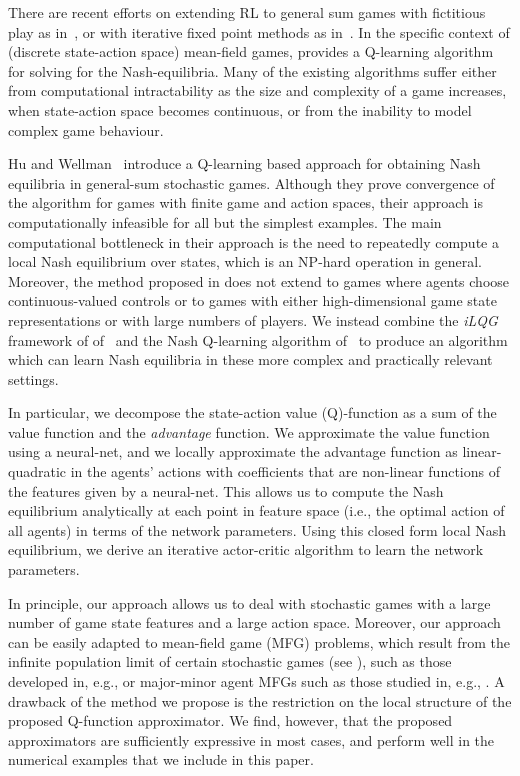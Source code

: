 \documentclass[onefignum,onetabnum]{siamonline171218}
\begin{document}
There are recent efforts on extending RL to general sum games with fictitious play as in~\cite{hu2019deep}, or with iterative fixed point methods as in~\cite{lanctot2017unified}. In the specific context of (discrete state-action space) mean-field games, \cite{guo2019learning} provides a Q-learning algorithm for solving for the Nash-equilibria. Many of the existing algorithms suffer either from computational intractability as the size and complexity of a game increases, when state-action space becomes continuous, or from the inability to model complex game behaviour.

Hu and Wellman~\cite{hu2003nash} introduce a Q-learning based approach for obtaining Nash equilibria in general-sum stochastic games. Although they prove convergence of the algorithm for games with finite game and action spaces,  their approach is computationally infeasible for all but the simplest examples. The main computational bottleneck in their approach is the need to repeatedly compute a local Nash equilibrium over states, which is an NP-hard operation in general. Moreover, the method proposed in \cite{hu2003nash} does not extend to games where agents choose continuous-valued controls or to games with either high-dimensional game state representations or with large numbers of players. We instead combine the \textit{iLQG} framework of of~\cite{todorov2005generalized,gu2016continuous} and the Nash Q-learning algorithm of~\cite{hu2003nash} to produce an algorithm which can learn Nash equilibria in these more complex and practically relevant settings. 

In particular, we decompose the state-action value (Q)-function as a sum of the value function and the \textit{advantage} function. We approximate the value function using a neural-net, and we locally approximate the advantage function as linear-quadratic in the agents' actions with coefficients that are non-linear functions of the features given by a neural-net. This allows us to compute the Nash equilibrium analytically at each point in feature space (i.e., the optimal action of all agents) in terms of the network parameters. Using this closed form local Nash equilibrium, we derive an iterative actor-critic algorithm to learn the network parameters.

In principle, our approach allows us to deal with stochastic games with a large number of game state features and a large action space. Moreover, our approach can be easily adapted to mean-field game (MFG) problems, which result from the infinite population limit of certain stochastic games (see \cite{huang2006large,lasry2007mean,carmona2017probabilistic}), such as those developed in, e.g., \cite{casgrain2020mean,casgrain2018algorithmic} or major-minor agent MFGs such as those studied in, e.g., \cite{huang2010large,nourian2013ep,huang2015mean}. A drawback of the method we propose is the restriction on the local structure of the proposed Q-function approximator. We find, however, that the proposed approximators are sufficiently expressive in most cases, and perform well in the numerical examples that we include in this paper.
\end{document}
